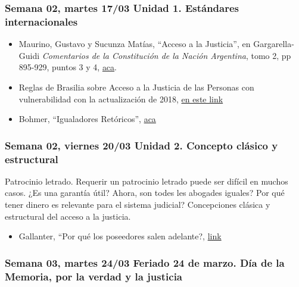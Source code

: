 \documentclass[
]{article}
\providecommand{\tightlist}{%
  \setlength{\itemsep}{0pt}\setlength{\parskip}{0pt}}
\begin{document}
\subsubsection{Semana 02, martes 17/03 Unidad 1. Estándares
internacionales}\label{semana-02-martes-1703-unidad-1.-estuxe1ndares-internacionales}

\begin{itemize}
\item
  Maurino, Gustavo y Sucunza Matías, ``Acceso a la Justicia'', en
  Gargarella- Guidi \emph{Comentarios de la Constitución de la Nación
  Argentina}, tomo 2, pp 895-929, puntos 3 y 4,
  \href{https://drive.google.com/file/d/1On39ejMciqQNjJIpz1fPseKak_KCjuuF/view?usp=sharing}{aca}.
\item
  Reglas de Brasilia sobre Acceso a la Justicia de las Personas con
  vulnerabilidad con la actualización de 2018,
  \href{https://brasilia100r.com/wp-content/uploads/2020/07/Reglas-de-Brasilia-actualizaci\%C3\%B3n-2018.pdf}{en
  este link}
\end{itemize}

\begin{itemize}
\tightlist
\item
  Bohmer, ``Igualadores Retóricos'',
  \href{https://drive.google.com/file/d/0B50ljTnhr79kMWQ2OTgzYzMtNGNiNS00YjQxLThjYjYtYzg2YWYyNzc0MTlh/view?usp=sharing&resourcekey=0-QzTl1yGSNgnHMOI_ICHjEg}{aca}
\end{itemize}

\subsubsection{Semana 02, viernes 20/03 Unidad 2. Concepto clásico y
estructural}\label{semana-02-viernes-2003-unidad-2.-concepto-cluxe1sico-y-estructural}

Patrocinio letrado. Requerir un patrocinio letrado puede ser difícil en
muchos casos. ¿Es una garantía útil? Ahora, son todes les abogades
iguales? Por qué tener dinero es relevante para el sistema judicial?
Concepciones clásica y estructural del acceso a la justicia.

\begin{itemize}
\tightlist
\item
  Gallanter, ``Por qué los poseedores salen adelante?,
  \href{https://drive.google.com/file/d/1Fj3STLmXxHrJglgGgs5JUtDjXy0DSJ3o/view?usp=sharing}{link}
\end{itemize}

\subsubsection{\texorpdfstring{{Semana 03, martes 24/03 Feriado 24 de
marzo. Día de la Memoria, por la verdad y la
justicia}}{Semana 03, martes 24/03 Feriado 24 de marzo. Día de la Memoria, por la verdad y la justicia}}\label{semana-03-martes-2403-feriado-24-de-marzo.-duxeda-de-la-memoria-por-la-verdad-y-la-justicia}
\end{document}
